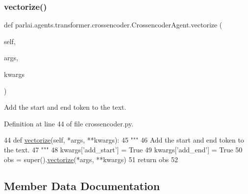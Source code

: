 \subsubsection{\texorpdfstring{vectorize()}{vectorize()}}
{\footnotesize\ttfamily def parlai.\+agents.\+transformer.\+crossencoder.\+Crossencoder\+Agent.\+vectorize (\begin{DoxyParamCaption}\item[{}]{self,  }\item[{}]{args,  }\item[{}]{kwargs }\end{DoxyParamCaption})}

\begin{DoxyVerb}Add the start and end token to the text.
\end{DoxyVerb}
 

Definition at line 44 of file crossencoder.\+py.


\begin{DoxyCode}
44     \textcolor{keyword}{def }\hyperlink{namespaceparlai_1_1agents_1_1drqa_1_1utils_a5c76cc39e3014c7bcf9199d566dbdc0f}{vectorize}(self, *args, **kwargs):
45         \textcolor{stringliteral}{"""}
46 \textcolor{stringliteral}{        Add the start and end token to the text.}
47 \textcolor{stringliteral}{        """}
48         kwargs[\textcolor{stringliteral}{'add\_start'}] = \textcolor{keyword}{True}
49         kwargs[\textcolor{stringliteral}{'add\_end'}] = \textcolor{keyword}{True}
50         obs = super().\hyperlink{namespaceparlai_1_1agents_1_1drqa_1_1utils_a5c76cc39e3014c7bcf9199d566dbdc0f}{vectorize}(*args, **kwargs)
51         \textcolor{keywordflow}{return} obs
52 
\end{DoxyCode}


\subsection{Member Data Documentation}
\mbox{\label{classparlai_1_1agents_1_1transformer_1_1crossencoder_1_1CrossencoderAgent_a991c76bbbb234ba482e3eaf3b6813bc8}} 
